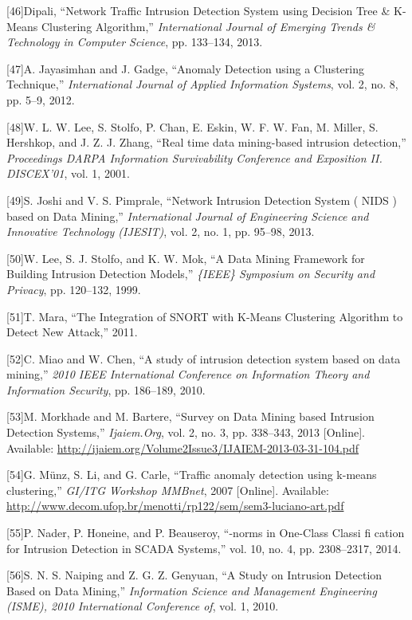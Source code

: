 \documentclass[11pt,]{article}
\begin{document}
{[}46{]}Dipali, ``Network Traffic Intrusion Detection System using
Decision Tree \& K-Means Clustering Algorithm,'' \emph{International
Journal of Emerging Trends \& Technology in Computer Science}, pp.
133--134, 2013.

{[}47{]}A. Jayasimhan and J. Gadge, ``Anomaly Detection using a
Clustering Technique,'' \emph{International Journal of Applied
Information Systems}, vol. 2, no. 8, pp. 5--9, 2012.

{[}48{]}W. L. W. Lee, S. Stolfo, P. Chan, E. Eskin, W. F. W. Fan, M.
Miller, S. Hershkop, and J. Z. J. Zhang, ``Real time data mining-based
intrusion detection,'' \emph{Proceedings DARPA Information Survivability
Conference and Exposition II. DISCEX'01}, vol. 1, 2001.

{[}49{]}S. Joshi and V. S. Pimprale, ``Network Intrusion Detection
System ( NIDS ) based on Data Mining,'' \emph{International Journal of
Engineering Science and Innovative Technology (IJESIT)}, vol. 2, no. 1,
pp. 95--98, 2013.

{[}50{]}W. Lee, S. J. Stolfo, and K. W. Mok, ``A Data Mining Framework
for Building Intrusion Detection Models,'' \emph{\{IEEE\} Symposium on
Security and Privacy}, pp. 120--132, 1999.

{[}51{]}T. Mara, ``The Integration of SNORT with K-Means Clustering
Algorithm to Detect New Attack,'' 2011.

{[}52{]}C. Miao and W. Chen, ``A study of intrusion detection system
based on data mining,'' \emph{2010 IEEE International Conference on
Information Theory and Information Security}, pp. 186--189, 2010.

{[}53{]}M. Morkhade and M. Bartere, ``Survey on Data Mining based
Intrusion Detection Systems,'' \emph{Ijaiem.Org}, vol. 2, no. 3, pp.
338--343, 2013 {[}Online{]}. Available:
\url{http://ijaiem.org/Volume2Issue3/IJAIEM-2013-03-31-104.pdf}

{[}54{]}G. Münz, S. Li, and G. Carle, ``Traffic anomaly detection using
k-means clustering,'' \emph{GI/ITG Workshop MMBnet}, 2007 {[}Online{]}.
Available:
\url{http://www.decom.ufop.br/menotti/rp122/sem/sem3-luciano-art.pdf}

{[}55{]}P. Nader, P. Honeine, and P. Beauseroy, ``-norms in One-Class
Classi fi cation for Intrusion Detection in SCADA Systems,'' vol. 10,
no. 4, pp. 2308--2317, 2014.

{[}56{]}S. N. S. Naiping and Z. G. Z. Genyuan, ``A Study on Intrusion
Detection Based on Data Mining,'' \emph{Information Science and
Management Engineering (ISME), 2010 International Conference of}, vol.
1, 2010.
\end{document}
